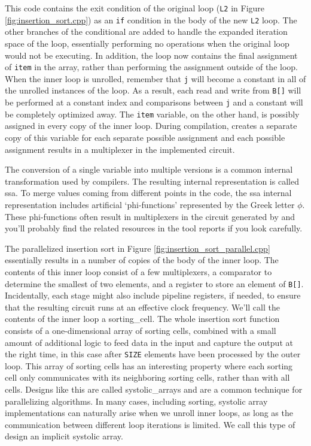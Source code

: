This code contains the exit condition of the original loop (\lstinline{L2} in Figure \ref{fig:insertion_sort.cpp}) as an \lstinline{if} condition in the body of the new \lstinline{L2} loop.  The other branches of the conditional are added to handle the expanded iteration space of the loop, essentially performing no operations when the original loop would not be executing.  In addition, the loop now contains the final assignment of \lstinline{item} in the array, rather than performing the assignment outside of the loop.  When the inner loop is unrolled, remember that \lstinline{j} will become a constant in all of the unrolled instances of the loop.  As a result, each read and write from \lstinline{B[]} will be performed at a constant index and comparisons between \lstinline{j} and a constant will be completely optimized away.  The \lstinline{item} variable, on the other hand, is possibly assigned in every copy of the inner loop.  During compilation, \VHLS creates a separate copy of this variable for each separate possible assignment and each possible assignment results in a multiplexer in the implemented circuit.

\begin{aside}
The conversion of a single variable into multiple versions is a common internal transformation used by compilers.  The resulting internal representation is called \gls{ssa}.  To merge values coming from different points in the code, the \gls{ssa} internal representation includes artificial `phi-functions' represented by the Greek letter $\phi$.  These phi-functions often result in multiplexers in the circuit generated by \VHLS and you'll probably find the related resources in the tool reports if you look carefully.
\end{aside}

The parallelized insertion sort in Figure \ref{fig:insertion_sort_parallel.cpp} essentially results in a number of copies of the body of the inner loop.   The contents of this inner loop consist of a few multiplexers, a comparator to determine the smallest of two elements, and a register to store an element of \lstinline{B[]}.  Incidentally, each stage might also include pipeline registers, if needed, to ensure that the resulting circuit runs at an effective clock frequency.  We'll call the contents of the inner loop a \gls{sorting_cell}.  The whole insertion sort function consists of a one-dimensional array of sorting cells, combined with a small amount of additional logic to feed data in the input and capture the output at the right time, in this case after \lstinline{SIZE} elements have been processed by the outer loop.  This array of sorting cells has an interesting property where each sorting cell only communicates with its neighboring sorting cells, rather than with all cells.  Designs like this are called \glspl{systolic_array} and are a common technique for parallelizing algorithms. In many cases, including sorting, systolic array implementations can naturally arise when we unroll inner loops, as long as the communication between different loop iterations is limited.   We call this type of design an implicit systolic array.

